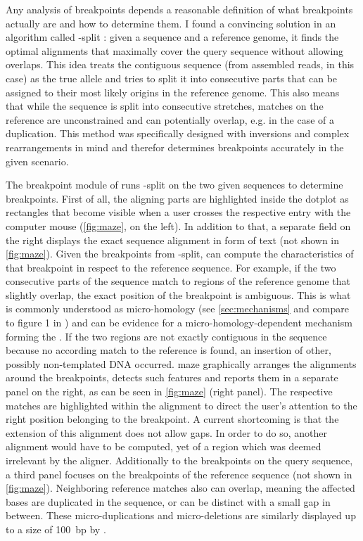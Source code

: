 Any analysis of \sv breakpoints depends a reasonable definition of what
breakpoints actually are and how to determine them. I found a convincing
solution in an algorithm called \last-split \citep{Frith2015}: given a sequence
and a reference genome, it finds the optimal alignments that maximally cover the
query sequence without allowing overlaps.  This idea treats the contiguous
sequence (from assembled reads, in this case) as the true allele and tries to
split it into consecutive parts that can be assigned to their most likely
origins in the reference genome. This also means that while the sequence is
split into consecutive stretches, matches on the reference are unconstrained and
can potentially overlap, e.g. in the case of a duplication. This method was
specifically designed with inversions and complex rearrangements in mind
and therefor determines breakpoints accurately in the given scenario.

The breakpoint module of \maze runs \last-split on the two given sequences to
determine breakpoints. First of all, the aligning parts are highlighted inside
the dotplot as rectangles that become visible when a user crosses the respective
entry with the computer mouse (\cref{fig:maze}, on the left). In addition to
that, a separate field on the right displays the exact sequence alignment in
form of text (not shown in \cref{fig:maze}). Given the breakpoints from
\last-split, \maze can compute the characteristics of that breakpoint in respect
to the reference sequence. For example, if the two consecutive parts of the
sequence match to regions of the reference genome that slightly overlap, the
exact position of the breakpoint is ambiguous. This is what is commonly
understood as micro-homology (see \cref{sec:mechanisms} and compare to
figure 1 in \cite{Hastings2009}) and can be evidence for a
micro-homology-dependent mechanism forming the \sv. If the two regions are not
exactly contiguous in the sequence because no according match to the reference
is found, an insertion of other, possibly non-templated DNA occurred. \Ac{maze}
graphically arranges the alignments around the breakpoints, detects such
features and reports them in a separate panel on the right, as can be seen in
\cref{fig:maze} (right panel). The respective matches are highlighted within the
alignment to direct the user’s attention to the right position belonging to the
breakpoint. A current shortcoming is that the extension of this alignment does
not allow gaps. In order to do so, another alignment would have to be computed,
yet of a region which was deemed irrelevant by the \last aligner. Additionally
to the breakpoints on the query sequence, a third panel focuses on the
breakpoints of the reference sequence (not shown in \cref{fig:maze}).
Neighboring reference matches also can overlap, meaning the affected bases are
duplicated in the sequence, or can be distinct with a small gap in between.
These micro-duplications and micro-deletions are similarly displayed up to a
size of 100~bp by \maze.

